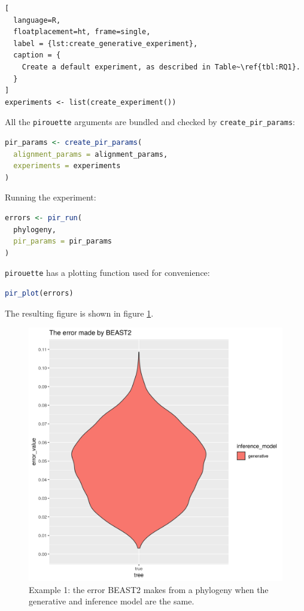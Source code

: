 \documentclass{article}
\begin{document}
\begin{lstlisting}[
  language=R, 
  floatplacement=ht, frame=single,
  label = {lst:create_generative_experiment},
  caption = {
    Create a default experiment, as described in Table~\ref{tbl:RQ1}.
  }
]
experiments <- list(create_experiment())
\end{lstlisting}

All the \verb;pirouette; arguments are bundled
and checked by \verb;create_pir_params;:

\begin{lstlisting}[language=R, floatplacement=ht, frame=single]
pir_params <- create_pir_params(
  alignment_params = alignment_params,
  experiments = experiments
)
\end{lstlisting}

Running the experiment:

\begin{lstlisting}[language=R, floatplacement=ht, frame=single]
errors <- pir_run(
  phylogeny,
  pir_params = pir_params
)
\end{lstlisting}

\verb;pirouette; has a plotting function used for convenience:

\begin{lstlisting}[language=R, floatplacement=ht, frame=single]
pir_plot(errors)
\end{lstlisting}

The resulting figure is shown in figure \ref{fig:example_1}.

\begin{figure}[ht]
  \includegraphics[width=\textwidth]{example_1_errors.png}
  \caption{
    Example 1: the error BEAST2 makes from a phylogeny 
    when the generative and inference model are the same.
  }
  \label{fig:example_1}
\end{figure}
\end{document}
